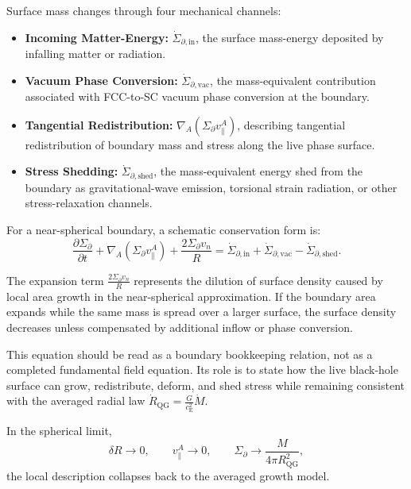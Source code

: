Surface mass changes through four mechanical channels:
\begin{itemize}
    \item \textbf{Incoming Matter-Energy:} $\dot{\Sigma}_{\partial,\mathrm{in}}$, the surface mass-energy deposited by infalling matter or radiation.
    \item \textbf{Vacuum Phase Conversion:} $\dot{\Sigma}_{\partial,\mathrm{vac}}$, the mass-equivalent contribution associated with FCC-to-SC vacuum phase conversion at the boundary.
    \item \textbf{Tangential Redistribution:} $\nabla_A\left(\Sigma_{\partial} v_{\parallel}^{A}\right)$, describing tangential redistribution of boundary mass and stress along the live phase surface.
    \item \textbf{Stress Shedding:} $\dot{\Sigma}_{\partial,\mathrm{shed}}$, the mass-equivalent energy shed from the boundary as gravitational-wave emission, torsional strain radiation, or other stress-relaxation channels.
\end{itemize}

For a near-spherical boundary, a schematic conservation form is:
\begin{equation}
    \frac{\partial \Sigma_{\partial}}{\partial t} + \nabla_A\left(\Sigma_{\partial} v_{\parallel}^{A}\right) + \frac{2\Sigma_{\partial}v_n}{R} = \dot{\Sigma}_{\partial,\mathrm{in}} + \dot{\Sigma}_{\partial,\mathrm{vac}} - \dot{\Sigma}_{\partial,\mathrm{shed}}.
\end{equation}

The expansion term $\frac{2\Sigma_{\partial}v_n}{R}$ represents the dilution of surface density caused by local area growth in the near-spherical approximation. If the boundary area expands while the same mass is spread over a larger surface, the surface density decreases unless compensated by additional inflow or phase conversion.

This equation should be read as a boundary bookkeeping relation, not as a completed fundamental field equation. Its role is to state how the live black-hole surface can grow, redistribute, deform, and shed stress while remaining consistent with the averaged radial law $\dot{R}_{\mathrm{QG}} = \frac{G}{c_{\mathrm{E}}^2}\dot{M}$.

In the spherical limit,
\begin{equation}
    \delta R \rightarrow 0, \qquad v_{\parallel}^{A} \rightarrow 0, \qquad \Sigma_{\partial} \rightarrow \frac{M}{4\pi R_{\mathrm{QG}}^2},
\end{equation}
the local description collapses back to the averaged growth model.

